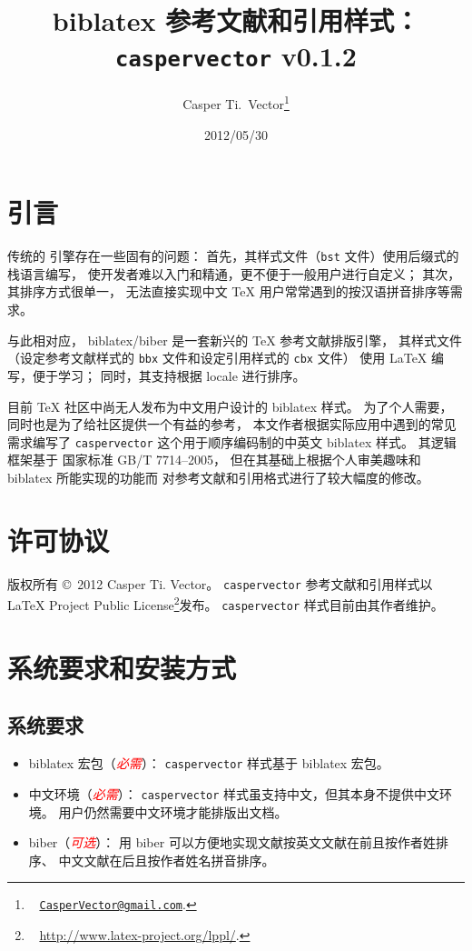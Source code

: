 \documentclass[UTF8, fancyhdr, hyperref]{ctexart}
\newcommand{\myemph}[1]{\emph{\textcolor{red}{#1}}}
\begin{document}
\title{\textbf{biblatex 参考文献和引用样式：\texttt{caspervector} v0.1.2}}
\author{%
	Casper Ti.\ Vector\thanks{\ %
		\href{mailto:CasperVector@gmail.com}{\texttt{CasperVector@gmail.com}}.%
	}%
}
\date{2012/05/30}
\maketitle

\section{引言}

传统的  引擎存在一些固有的问题：
首先，其样式文件（\verb|bst| 文件）使用后缀式的栈语言编写，
使开发者难以入门和精通，更不便于一般用户进行自定义；
其次，其排序方式很单一，
无法直接实现中文 \TeX{} 用户常常遇到的按汉语拼音排序等需求。

与此相对应，
biblatex\supercite{biblatex}/biber\supercite{biber}
是一套新兴的 \TeX{} 参考文献排版引擎，
其样式文件（设定参考文献样式的 \verb|bbx| 文件和设定引用样式的 \verb|cbx| 文件）
使用 \LaTeX{} 编写，便于学习；
同时，其支持根据 locale 进行排序。

目前 \TeX{} 社区中尚无人发布为中文用户设计的 biblatex 样式。
为了个人需要，同时也是为了给社区提供一个有益的参考，
本文作者根据实际应用中遇到的常见需求编写了
\verb|caspervector| 这个用于顺序编码制的中英文 biblatex 样式。
其逻辑框架基于
国家标准 GB/T 7714--2005\supercite{gbt7714-2005}，
但在其基础上根据个人审美趣味和 biblatex 所能实现的功能而
对参考文献和引用格式进行了较大幅度的修改。

\section{许可协议}

版权所有 \copyright\ 2012 Casper Ti. Vector。%
\verb|caspervector| 参考文献和引用样式以
\LaTeX{} Project Public License\footnote{\ %
	\url{http://www.latex-project.org/lppl/}.%
}发布。%
\verb|caspervector| 样式目前由其作者维护。

\section{系统要求和安装方式}
\subsection{系统要求}

\begin{itemize}
	\item biblatex 宏包（\myemph{必需}）：
		\verb|caspervector| 样式基于 biblatex 宏包。
	\item 中文环境（\myemph{必需}）：
		\verb|caspervector| 样式虽支持中文，但其本身不提供中文环境。
		用户仍然需要中文环境才能排版出文档。
	\item biber（\myemph{可选}）：
		用 biber 可以方便地实现文献按英文文献在前且按作者姓排序、
		中文文献在后且按作者姓名拼音排序。
\end{itemize}
\end{document}
